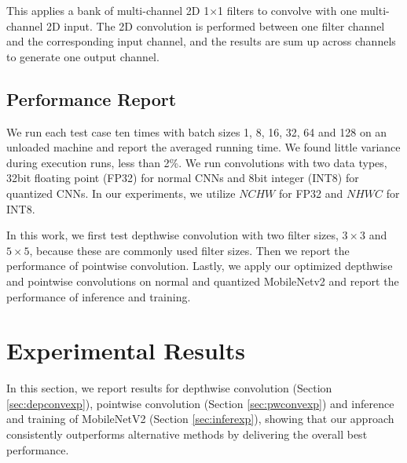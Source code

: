  This applies a bank of multi-channel 2D 1$\times$1 filters to convolve with one multi-channel 2D input. 
The 2D convolution is performed between one filter channel and the corresponding input channel, and the results are sum up across channels to generate one output channel.


\subsection{Performance Report}
We run each test case ten times with batch sizes 1, 8, 16, 32, 64 and 128 on an unloaded machine and report the averaged running time. 
We found little variance during execution runs, less than 2\%.
We run convolutions with two data types, 32bit floating point (FP32) for normal CNNs and 8bit integer (INT8) for quantized CNNs.
In our experiments, we utilize $NCHW$ for FP32 and $NHWC$ for INT8.

In this work, we first test depthwise convolution with two filter sizes, $3 \times 3$ and $5 \times 5$, because these are commonly used filter sizes. 
Then we report the performance of pointwise convolution. 
Lastly, we apply our optimized depthwise and pointwise convolutions on normal and quantized MobileNetv2 and report the performance of inference and training.
%

\section{Experimental Results}
\label{exp} In this section, we report results for depthwise convolution (Section \ref{sec:depconvexp}), pointwise convolution (Section \ref{sec:pwconvexp}) and inference and training of MobileNetV2 (Section \ref{sec:inferexp}), showing that our approach consistently outperforms alternative methods by delivering the overall best performance.


